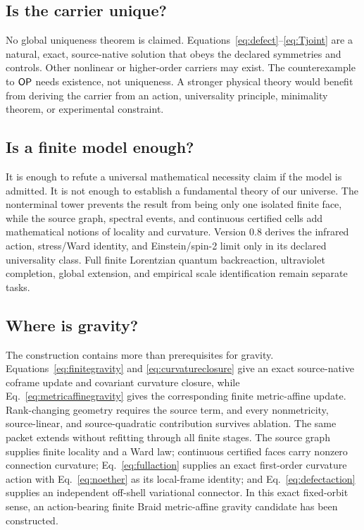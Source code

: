 \subsection{Is the carrier unique?}

No global uniqueness theorem is claimed. Equations~\eqref{eq:defect}--\eqref{eq:Tjoint} are a natural, exact, source-native solution that obeys the declared symmetries and controls. Other nonlinear or higher-order carriers may exist. The counterexample to $\mathsf{OP}$ needs existence, not uniqueness. A stronger physical theory would benefit from deriving the carrier from an action, universality principle, minimality theorem, or experimental constraint.

\subsection{Is a finite model enough?}

It is enough to refute a universal mathematical necessity claim if the model is admitted. It is not enough to establish a fundamental theory of our universe. The nonterminal tower prevents the result from being only one isolated finite face, while the source graph, spectral events, and continuous certified cells add mathematical notions of locality and curvature. Version 0.8 derives the infrared action, stress/Ward identity, and Einstein/spin-2 limit only in its declared universality class. Full finite Lorentzian quantum backreaction, ultraviolet completion, global extension, and empirical scale identification remain separate tasks.

\subsection{Where is gravity?}

The construction contains more than prerequisites for gravity. Equations~\eqref{eq:finitegravity} and \eqref{eq:curvatureclosure} give an exact source-native coframe update and covariant curvature closure, while Eq.~\eqref{eq:metricaffinegravity} gives the corresponding finite metric-affine update. Rank-changing geometry requires the source term, and every nonmetricity, source-linear, and source-quadratic contribution survives ablation. The same packet extends without refitting through all finite stages. The source graph supplies finite locality and a Ward law; continuous certified faces carry nonzero connection curvature; Eq.~\eqref{eq:fullaction} supplies an exact first-order curvature action with Eq.~\eqref{eq:noether} as its local-frame identity; and Eq.~\eqref{eq:defectaction} supplies an independent off-shell variational connector. In this exact fixed-orbit sense, an action-bearing finite Braid metric-affine gravity candidate has been constructed.

